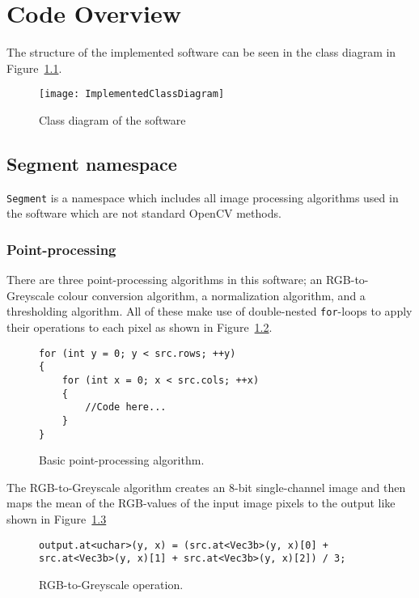 \chapter{Code Overview}\label{ch:codeover}

The structure of the implemented software can be seen in the class diagram in Figure~\ref{fig:implementedClassDiagram}.

\begin{figure}
	\centering
	\texttt{[image: ImplementedClassDiagram]}
	\caption{Class diagram of the software \label{fig:implementedClassDiagram}}
	
\end{figure}

\section{Segment namespace}
\texttt{Segment} is a namespace which includes all image processing algorithms used in the software which are not standard OpenCV methods.

\subsection{Point-processing}
There are three point-processing algorithms in this software; an RGB-to-Greyscale colour conversion algorithm, a normalization algorithm, and a thresholding algorithm. All of these make use of double-nested \texttt{for}-loops to apply their operations to each pixel as shown in Figure~\ref{fig:pointprocess}.
\begin{figure}[!h]
\begin{lstlisting}
for (int y = 0; y < src.rows; ++y)
{
	for (int x = 0; x < src.cols; ++x)
	{
		//Code here...
	}
}
\end{lstlisting}
\caption{Basic point-processing algorithm. \label{fig:pointprocess}}
\end{figure} 

The RGB-to-Greyscale algorithm creates an 8-bit single-channel image and then maps the mean of the RGB-values of the input image pixels to the output like shown in Figure~\ref{fig:rgb2gray}

\begin{figure}[!h]
\begin{lstlisting}
output.at<uchar>(y, x) = (src.at<Vec3b>(y, x)[0] + src.at<Vec3b>(y, x)[1] + src.at<Vec3b>(y, x)[2]) / 3;
\end{lstlisting}
\caption{RGB-to-Greyscale operation.\label{fig:rgb2gray}}
\end{figure}

